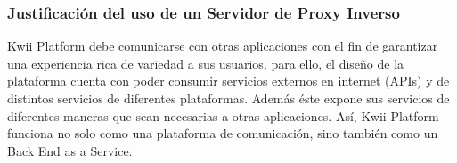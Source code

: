 

\subsubsection{Justificación del uso de un Servidor de Proxy Inverso}
Kwii Platform debe comunicarse con otras aplicaciones con el fin de garantizar una experiencia rica de variedad a sus usuarios, para ello, el diseño de la plataforma cuenta con poder consumir servicios externos en internet (APIs) y de distintos servicios de diferentes plataformas. Además éste expone sus servicios de diferentes maneras que sean necesarias a otras aplicaciones. Así, Kwii Platform funciona no solo como una plataforma de comunicación, sino también como un Back End as a Service.